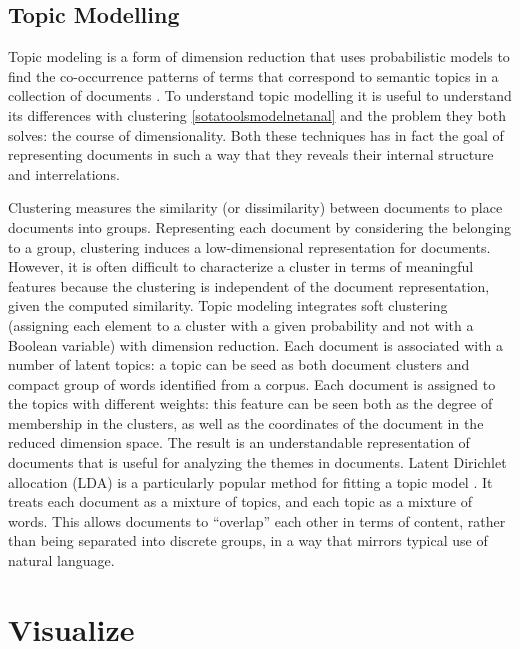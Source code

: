 \documentclass[b5paper,]{book}
\theoremstyle{definition}
\theoremstyle{definition}
\theoremstyle{definition}
\theoremstyle{remark}
\begin{document}
\subsection{Topic Modelling}\label{sotatoolsmodeltopicmodel}

Topic modeling is a form of dimension reduction that uses probabilistic
models to find the co-occurrence patterns of terms that correspond to
semantic topics in a collection of documents
\citep{crain2012dimensionality}. To understand topic modelling it is
useful to understand its differences with clustering
\ref{sotatoolsmodelnetanal} and the problem they both solves: the course
of dimensionality. Both these techniques has in fact the goal of
representing documents in such a way that they reveals their internal
structure and interrelations.

Clustering measures the similarity (or dissimilarity) between documents
to place documents into groups. Representing each document by
considering the belonging to a group, clustering induces a
low-dimensional representation for documents. However, it is often
difficult to characterize a cluster in terms of meaningful features
because the clustering is independent of the document representation,
given the computed similarity. Topic modeling integrates soft clustering
(assigning each element to a cluster with a given probability and not
with a Boolean variable) with dimension reduction. Each document is
associated with a number of latent topics: a topic can be seed as both
document clusters and compact group of words identified from a corpus.
Each document is assigned to the topics with different weights: this
feature can be seen both as the degree of membership in the clusters, as
well as the coordinates of the document in the reduced dimension space.
The result is an understandable representation of documents that is
useful for analyzing the themes in documents. Latent Dirichlet
allocation (LDA) is a particularly popular method for fitting a topic
model \citep{blei2003latent}. It treats each document as a mixture of
topics, and each topic as a mixture of words. This allows documents to
``overlap'' each other in terms of content, rather than being separated
into discrete groups, in a way that mirrors typical use of natural
language.

\section{Visualize}\label{sotatoolsvisualize}
\end{document}
